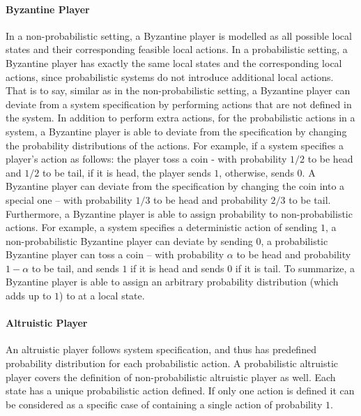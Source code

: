 \paragraph{Byzantine Player}
In a non-probabilistic setting, a Byzantine player is modelled as all possible local states and their corresponding feasible local actions.
In a probabilistic setting, a Byzantine player has exactly the same local states and the corresponding local actions, since probabilistic systems do not introduce additional local actions.
That is to say, similar as in the non-probabilistic setting, a Byzantine player can deviate from a system specification by performing actions that are not defined in the system.
In addition to perform extra actions, for the probabilistic actions in a system, a Byzantine player is able to deviate from the specification by changing the probability distributions of the actions. For example, if a system specifies a player's action as follows: the player toss a coin - with probability $1/2$ to be head and $1/2$ to be tail, if it is head, the player sends $1$, otherwise, sends $0$. A Byzantine player can deviate from the specification by changing the coin into a special one -- with probability $1/3$ to be head and probability $2/3$ to be tail. Furthermore, a Byzantine player is able to assign probability to non-probabilistic actions. For example, a system specifies a deterministic action of sending $1$, a non-probabilistic Byzantine player can deviate by sending $0$, a probabilistic Byzantine player can toss a coin -- with probability $\alpha$ to be head and probability $1-\alpha$ to be tail, and sends $1$ if it is head and sends $0$ if it is tail. To summarize, a Byzantine player is able to assign an arbitrary probability distribution (which adds up to $1$) to at a local state.



\paragraph{Altruistic Player}
An altruistic player follows system specification, and thus has predefined probability distribution for each probabilistic action. A probabilistic altruistic player covers the definition of non-probabilistic altruistic player as well. Each state has a unique probabilistic action defined. If only one action is defined it can be considered as a specific case of containing a single action of probability $1$.

